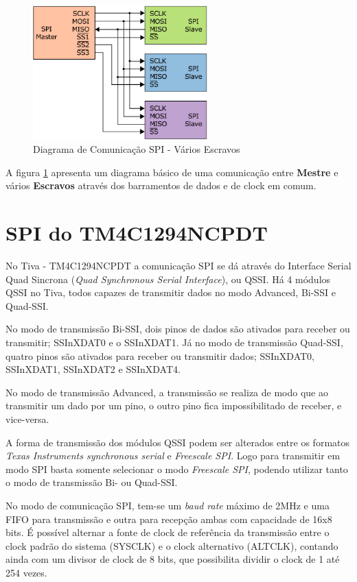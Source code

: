 \begin{figure}[H]
	\centering
	\includegraphics[width=0.6\textwidth] {figuras/BarramentoSPI.eps}
	\caption{Diagrama de Comunicação SPI - Vários Escravos}
	\label{fig:SPIDiagrama}
\end{figure}

A figura  \ref{fig:SPIDiagrama} apresenta um diagrama básico de uma comunicação entre \textbf{Mestre} e vários \textbf{Escravos} através dos barramentos de dados e de clock em comum.  

\section{SPI do TM4C1294NCPDT}

No Tiva - TM4C1294NCPDT a comunicação SPI se dá através do Interface Serial Quad Sincrona (\emph{Quad Synchronous Serial Interface}), ou QSSI. Há 4 módulos QSSI no Tiva, todos capazes de transmitir dados no modo Advanced, Bi-SSI e Quad-SSI.

No modo de transmissão Bi-SSI, dois pinos de dados são ativados para receber ou transmitir; SSInXDAT0 e o SSInXDAT1. Já no modo de transmissão Quad-SSI, quatro pinos são ativados para receber ou transmitir dados; SSInXDAT0, SSInXDAT1, SSInXDAT2 e SSInXDAT4. 

No modo de transmissão Advanced, a transmissão se realiza de modo que ao transmitir um dado por um pino, o outro pino fica impossibilitado de receber, e vice-versa.

A forma de transmissão dos módulos QSSI podem ser alterados entre os formatos \emph{Texas Instruments synchronous serial} e \emph{Freescale SPI}. Logo para transmitir em modo SPI basta somente selecionar o modo \emph{Freescale SPI}, podendo utilizar tanto o modo de transmissão Bi- ou  Quad-SSI.

No modo de comunicação SPI, tem-se um \emph{baud rate} máximo de 2MHz e uma FIFO para transmissão e outra para recepção ambas com capacidade de 16x8 bits. É possível alternar a fonte de clock de referência da transmissão entre o clock padrão do sistema (SYSCLK) e o clock alternativo (ALTCLK), contando ainda com um divisor de clock de 8 bits, que possibilita dividir o clock de 1 até 254 vezes.  

